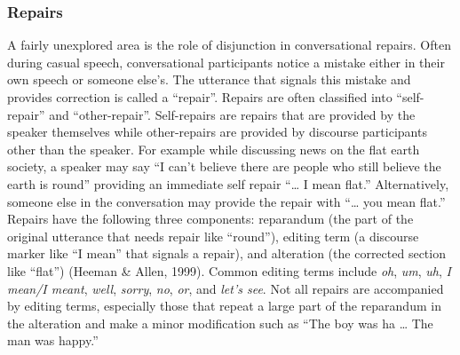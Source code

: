 \documentclass[oneside]{report}
\theoremstyle{definition}
\theoremstyle{definition}
\theoremstyle{definition}
\theoremstyle{remark}
\begin{document}
\subsubsection{Repairs}\label{repairs}

A fairly unexplored area is the role of disjunction in conversational
repairs. Often during casual speech, conversational participants notice
a mistake either in their own speech or someone else's. The utterance
that signals this mistake and provides correction is called a
``repair''. Repairs are often classified into ``self-repair'' and
``other-repair''. Self-repairs are repairs that are provided by the
speaker themselves while other-repairs are provided by discourse
participants other than the speaker. For example while discussing news
on the flat earth society, a speaker may say ``I can't believe there are
people who still believe the earth is round'' providing an immediate
self repair ``\ldots{} I mean flat.'' Alternatively, someone else in the
conversation may provide the repair with ``\ldots{} you mean flat.''
Repairs have the following three components: reparandum (the part of the
original utterance that needs repair like ``round''), editing term (a
discourse marker like ``I mean'' that signals a repair), and alteration
(the corrected section like ``flat'') (Heeman \& Allen, 1999). Common
editing terms include \emph{oh}, \emph{um}, \emph{uh}, \emph{I mean/I
meant}, \emph{well}, \emph{sorry}, \emph{no}, \emph{or}, and \emph{let's
see}. Not all repairs are accompanied by editing terms, especially those
that repeat a large part of the reparandum in the alteration and make a
minor modification such as ``The boy was ha \ldots{} The man was
happy.''
\end{document}
